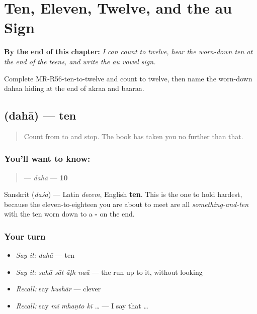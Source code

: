 
\chapter{Ten, Eleven, Twelve, and the au Sign}
\label{ch:mr-ten-to-twelve}

\begin{chapteropening}
\textbf{By the end of this chapter:} \emph{I can count to twelve, hear the worn-down ten at the end of the teens, and write the au vowel sign.}

Complete MR-R56-ten-to-twelve and count to twelve, then name the worn-down dahaa hiding at the end of akraa and baaraa.
\end{chapteropening}

\section[\texorpdfstring{\mr{दहा} (dahā)}{दहा (dahā)}]{ (dahā) — ten}

\label{lesson:MR-C56-daha}



\begin{quote}
Count from \textbf{} to \textbf{} and stop. The book has taken you no further than that.
\end{quote}

\subsection*{You'll want to know: }
\begin{quote}
\textbf{} — \emph{dahā} — \textbf{10}
\end{quote}

Sanskrit \textbf{} (\emph{daśa}) — Latin \emph{decem}, English \textbf{ten}. This is the one to hold hardest, because the eleven-to-eighteen you are about to meet are all \emph{something-and-ten} with the ten worn down to a \textbf{-} on the end.

\subsection*{Your turn}
\begin{itemize}
\raggedright
  \item \emph{Say it:} \emph{dahā} — ten
  \item \emph{Say it:} \emph{sahā sāt āṭh naū} — the run up to it, without looking
  \item \emph{Recall:} say \emph{hushār} — clever
  \item \emph{Recall:} say \emph{mī mhaṇto kī …} — I say that …
\end{itemize}


